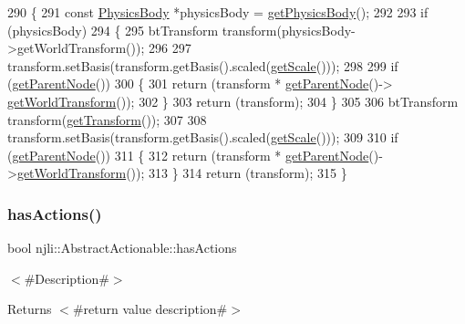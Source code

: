 \begin{DoxyCode}
290     \{
291       \textcolor{keyword}{const} \mbox{\hyperlink{classnjli_1_1_node_a5602338bf4d8e0e6baa58d3daa8dc90a}{PhysicsBody}} *physicsBody = \mbox{\hyperlink{classnjli_1_1_node_addb4eaa36fd97ae32b53b421c83408a0}{getPhysicsBody}}();
292 
293       \textcolor{keywordflow}{if} (physicsBody)
294         \{
295           btTransform transform(physicsBody->getWorldTransform());
296 
297           transform.setBasis(transform.getBasis().scaled(\mbox{\hyperlink{classnjli_1_1_node_a623cb5452d643d156fdaa2a7a0c2ce43}{getScale}}()));
298 
299           \textcolor{keywordflow}{if} (\mbox{\hyperlink{classnjli_1_1_node_a65ab991b8728c265d6d68d870450c1f3}{getParentNode}}())
300             \{
301               \textcolor{keywordflow}{return} (transform * \mbox{\hyperlink{classnjli_1_1_node_a65ab991b8728c265d6d68d870450c1f3}{getParentNode}}()->
      \mbox{\hyperlink{classnjli_1_1_node_a9db07db4b5fb817d5335d3b31531ffed}{getWorldTransform}}());
302             \}
303           \textcolor{keywordflow}{return} (transform);
304         \}
305 
306       btTransform transform(\mbox{\hyperlink{classnjli_1_1_node_ae54076fc2201492cead884c2dc7407b9}{getTransform}}());
307 
308       transform.setBasis(transform.getBasis().scaled(\mbox{\hyperlink{classnjli_1_1_node_a623cb5452d643d156fdaa2a7a0c2ce43}{getScale}}()));
309 
310       \textcolor{keywordflow}{if} (\mbox{\hyperlink{classnjli_1_1_node_a65ab991b8728c265d6d68d870450c1f3}{getParentNode}}())
311         \{
312           \textcolor{keywordflow}{return} (transform * \mbox{\hyperlink{classnjli_1_1_node_a65ab991b8728c265d6d68d870450c1f3}{getParentNode}}()->\mbox{\hyperlink{classnjli_1_1_node_a9db07db4b5fb817d5335d3b31531ffed}{getWorldTransform}}());
313         \}
314       \textcolor{keywordflow}{return} (transform);
315     \}
\end{DoxyCode}
\mbox{\label{classnjli_1_1_node_a237eba6122f8505a04df9bcc0cd431af}} 
\subsubsection{\texorpdfstring{has\+Actions()}{hasActions()}}
{\footnotesize\ttfamily bool njli\+::\+Abstract\+Actionable\+::has\+Actions}

$<$\#\+Description\#$>$

\begin{DoxyReturn}{Returns}
$<$\#return value description\#$>$ 
\end{DoxyReturn}
\mbox{\label{classnjli_1_1_node_ad6294680a8854dce1a887abd2b692b1d}} 
